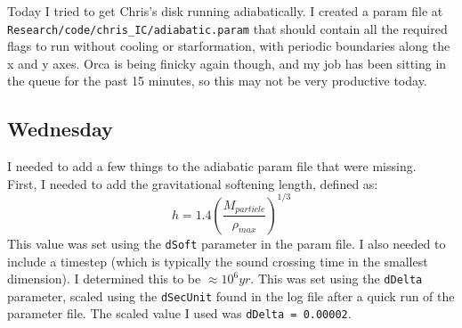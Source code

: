 \documentclass[11pt,letterpaper]{article}
\begin{document}
Today I tried to get Chris's disk running adiabatically. I created a
param file at \texttt{Research/code/chris\_IC/adiabatic.param} that
should contain all the required flags to run without cooling or
starformation, with periodic boundaries along the x and y axes. Orca is
being finicky again though, and my job has been sitting in the queue for
the past 15 minutes, so this may not be very productive today.

\subsection{Wednesday}

I needed to add a few things to the adiabatic param file that were
missing.\\First, I needed to add the gravitational softening length,
defined as: \[h=1.4(\frac{M_{particle}}{\rho_{max}})^{1/3}\] This value
was set using the \texttt{dSoft} parameter in the param file. I also
needed to include a timestep (which is typically the sound crossing time
in the smallest dimension). I determined this to be $\approx10^6yr$.
This was set using the \texttt{dDelta} parameter, scaled using the
\texttt{dSecUnit} found in the log file after a quick run of the
parameter file. The scaled value I used was \texttt{dDelta = 0.00002}.
\end{document}
